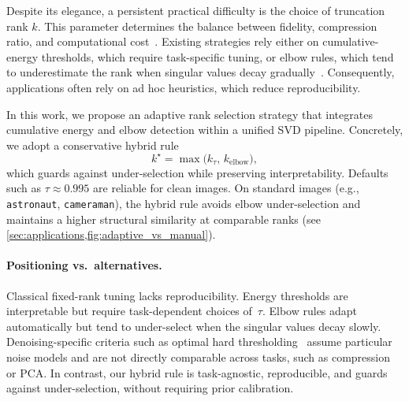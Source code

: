 \documentclass[11pt,a4paper]{article}
\begin{document}
Despite its elegance, a persistent practical difficulty is the choice of truncation rank $k$. This parameter determines the balance between fidelity, compression ratio, and computational cost~\cite{hansen1998rank,gavish2014optimal}. Existing strategies rely either on cumulative-energy thresholds, which require task-specific tuning, or elbow rules, which tend to underestimate the rank when singular values decay gradually~\cite{satopaa2011kneedle}. Consequently, applications often rely on ad hoc heuristics, which reduce reproducibility.

In this work, we propose an adaptive rank selection strategy that integrates cumulative energy and elbow detection within a unified SVD pipeline.
Concretely, we adopt a conservative hybrid rule
\[
k^\star = \max\!\bigl(k_\tau,\,k_{\text{elbow}}\bigr),
\]
which guards against under-selection while preserving interpretability.
Defaults such as $\tau\approx0.995$ are reliable for clean images. 
On standard images (e.g., \texttt{astronaut}, \texttt{cameraman}), the hybrid rule avoids elbow under-selection and maintains a higher structural similarity at comparable ranks (see \cref{sec:applications,fig:adaptive_vs_manual}).

\paragraph{Positioning vs.\ alternatives.}
Classical fixed-rank tuning lacks reproducibility. Energy thresholds are interpretable but require task-dependent choices of~$\tau$. 
Elbow rules adapt automatically but tend to under-select when the singular values decay slowly. 
Denoising-specific criteria such as optimal hard thresholding~\cite{gavish2014optimal} assume particular noise models 
and are not directly comparable across tasks, such as compression or PCA. 
In contrast, our hybrid rule is task-agnostic, reproducible, and guards against under-selection, without requiring prior calibration.
\end{document}
